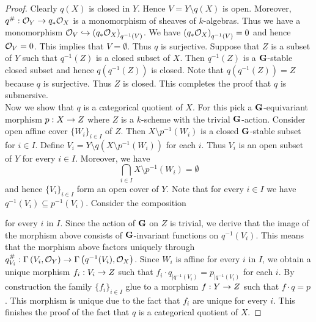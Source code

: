 \begin{proof}
Clearly $q(X)$ is closed in $Y$. Hence $V = Y\setminus q(X)$ is open. Moreover, $q^{\#}:{\mathcal O}_Y\rightarrow q_*{\mathcal O}_X$ is a monomorphism of sheaves of $k$-algebras. Thus we have a monomorphism ${\mathcal O}_V\hookrightarrow \left(q_*{\mathcal O}_X\right)_{q^{-1}(V)}$. We have $\left(q_*{\mathcal O}_X\right)_{q^{-1}(V)} =0$ and hence ${\mathcal O}_V =0$. This implies that $V = \emptyset$. Thus $q$ is surjective. Suppose that $Z$ is a subset of $Y$ such that $q^{-1}(Z)$ is a closed subset of $X$. Then $q^{-1}(Z)$ is a $\mathbf{G}$-stable closed subset and hence $q\left(q^{-1}(Z)\right)$ is closed. Note that $q\left(q^{-1}(Z)\right) = Z$ because $q$ is surjective. Thus $Z$ is closed. This completes the proof that $q$ is submersive.\\
Now we show that $q$ is a categorical quotient of $X$. For this pick a $\mathbf{G}$-equivariant morphism $p:X\rightarrow Z$ where $Z$ is a $k$-scheme with the trivial $\mathbf{G}$-action. Consider open affine cover $\{W_i\}_{i\in I}$ of $Z$. Then $X\setminus p^{-1}(W_i)$ is a closed $\mathbf{G}$-stable subset for $i\in I$. Define $V_i = Y \setminus q\left(X\setminus p^{-1}(W_i)\right)$ for each $i$. Thus $V_i$ is an open subset of $Y$ for every $i\in I$. Moreover, we have
$$\bigcap_{i\in I}X\setminus p^{-1}(W_i) = \emptyset$$
and hence $\{V_i\}_{i\in I}$ form an open cover of $Y$. Note that for every $i\in I$ we have $q^{-1}(V_i)\subseteq p^{-1}(V_i)$. Consider the composition
\begin{center}
\end{center}
for every $i$ in $I$. Since the action of $\mathbf{G}$ on $Z$ is trivial, we derive that the image of the morphism above consists of $\mathbf{G}$-invariant functions on $q^{-1}(V_i)$. This means that the morphism above factors uniquely through $q^{\#}_{V_i}:\Gamma\left(V_i,{\mathcal O}_Y\right)\rightarrow \Gamma\left(q^{-1}(V_i),{\mathcal O}_X\right)$. Since $W_i$ is affine for every $i$ in $I$, we obtain a unique morphism $f_i:V_i\rightarrow Z$ such that $f_i\cdot q_{\mid q^{-1}(V_i)} = p_{\mid q^{-1}(V_i)}$ for each $i$. By construction the family $\{f_i\}_{i\in I}$ glue to a morphism $f:Y\rightarrow Z$ such that $f\cdot q = p$. This morphism is unique due to the fact that $f_i$ are unique for every $i$. This finishes the proof of the fact that $q$ is a categorical quotient of $X$.
\end{proof}


